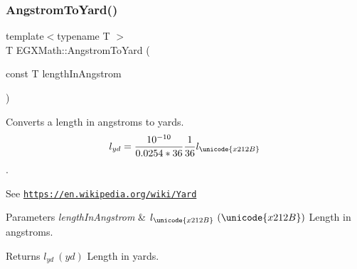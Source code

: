 \subsubsection{\texorpdfstring{Angstrom\+To\+Yard()}{AngstromToYard()}}
{\footnotesize\ttfamily template$<$typename T $>$ \\
T E\+G\+X\+Math\+::\+Angstrom\+To\+Yard (\begin{DoxyParamCaption}\item[{const T}]{length\+In\+Angstrom }\end{DoxyParamCaption})}



Converts a length in angstroms to yards. \[ l_{yd}= \frac{10^{-10}}{0.0254 * 36} \frac{1}{36} l_{\unicode{x212B}} \]. 

See \href{https://en.wikipedia.org/wiki/Yard}{\tt https\+://en.\+wikipedia.\+org/wiki/\+Yard} 
\begin{DoxyParams}{Parameters}
{\em length\+In\+Angstrom} & $ l_{\unicode{x212B}}\ (\unicode{x212B})$ Length in angstroms. \\
\hline
\end{DoxyParams}
\begin{DoxyReturn}{Returns}
$ l_{yd}\ (yd)$ Length in yards. 
\end{DoxyReturn}
